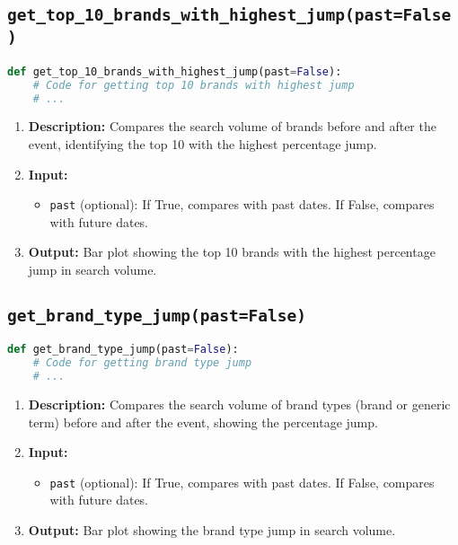 \subsection{\texttt{get\_top\_10\_brands\_with\_highest\_jump(past=False)}}
\begin{lstlisting}[language=Python]
def get_top_10_brands_with_highest_jump(past=False):
    # Code for getting top 10 brands with highest jump
    # ...

\end{lstlisting}
\begin{enumerate}
    \item \textbf{Description:} Compares the search volume of brands before and after the event, identifying the top 10 with the highest percentage jump.
    \item \textbf{Input:}
          \begin{itemize}
              \item \texttt{past} (optional): If True, compares with past dates. If False, compares with future dates.
          \end{itemize}
    \item \textbf{Output:} Bar plot showing the top 10 brands with the highest percentage jump in search volume.
\end{enumerate}

\subsection{\texttt{get\_brand\_type\_jump(past=False)}}
\begin{lstlisting}[language=Python]
def get_brand_type_jump(past=False):
    # Code for getting brand type jump
    # ...

\end{lstlisting}
\begin{enumerate}
    \item \textbf{Description:} Compares the search volume of brand types (brand or generic term) before and after the event, showing the percentage jump.
    \item \textbf{Input:}
          \begin{itemize}
              \item \texttt{past} (optional): If True, compares with past dates. If False, compares with future dates.
          \end{itemize}
    \item \textbf{Output:} Bar plot showing the brand type jump in search volume.
\end{enumerate}


